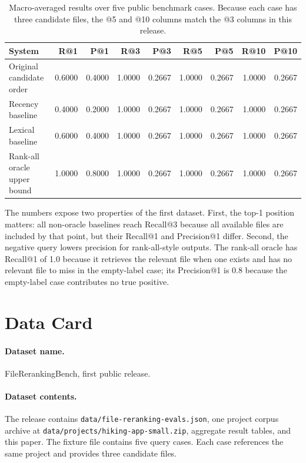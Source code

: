 \documentclass[11pt,a4paper]{article}
\begin{document}
\begin{table}[h]
\centering
\scriptsize
\setlength{\tabcolsep}{3pt}
\begin{tabularx}{\textwidth}{lrrrrrrrr}
\toprule
System & R@1 & P@1 & R@3 & P@3 & R@5 & P@5 & R@10 & P@10 \\
\midrule
Original candidate order & 0.6000 & 0.4000 & 1.0000 & 0.2667 & 1.0000 & 0.2667 & 1.0000 & 0.2667 \\
Recency baseline & 0.4000 & 0.2000 & 1.0000 & 0.2667 & 1.0000 & 0.2667 & 1.0000 & 0.2667 \\
Lexical baseline & 0.6000 & 0.4000 & 1.0000 & 0.2667 & 1.0000 & 0.2667 & 1.0000 & 0.2667 \\
Rank-all oracle upper bound & 1.0000 & 0.8000 & 1.0000 & 0.2667 & 1.0000 & 0.2667 & 1.0000 & 0.2667 \\
\bottomrule
\end{tabularx}
\caption{Macro-averaged results over five public benchmark cases. Because each
case has three candidate files, the @5 and @10 columns match the @3 columns in
this release.}
\label{tab:results}
\end{table}

The numbers expose two properties of the first dataset. First, the top-1
position matters: all non-oracle baselines reach Recall@3 because all available
files are included by that point, but their Recall@1 and Precision@1 differ.
Second, the negative query lowers precision for rank-all-style outputs. The
rank-all oracle has Recall@1 of 1.0 because it retrieves the relevant file when
one exists and has no relevant file to miss in the empty-label case; its
Precision@1 is 0.8 because the empty-label case contributes no true positive.

\section{Data Card}

\paragraph{Dataset name.}
FileRerankingBench, first public release.

\paragraph{Dataset contents.}
The release contains \texttt{data/file-reranking-evals.json}, one project corpus
archive at \texttt{data/projects/hiking-app-small.zip}, aggregate result tables,
and this paper. The fixture file contains five query cases. Each case references
the same project and provides three candidate files.
\end{document}
